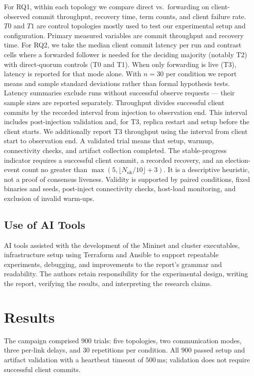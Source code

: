 \documentclass[11pt,a4paper]{article}
\begin{document}
For RQ1, within each topology we compare direct vs.\ forwarding on client-observed commit throughput, recovery time, term counts, and client failure rate.
$T0$ and $T1$ are control topologies mostly used to test our experimental setup and configuration.
Primary measured variables are commit throughput and recovery time.
For RQ2, we take the median client commit latency per run and contrast cells where a forwarded follower is needed for the deciding majority (notably T2) with direct-quorum controls (T0 and T1).
When only forwarding is live (T3), latency is reported for that mode alone.
With $n=30$ per condition we report means and sample standard deviations rather than formal hypothesis tests. Latency summaries exclude runs without successful observe requests --- their sample sizes are reported separately.
Throughput divides successful client commits by the recorded interval from injection to observation end. This interval includes post-injection validation and, for T3, replica restart and setup before the client starts. We additionally report T3 throughput using the interval from client start to observation end.
A validated trial means that setup, warmup, connectivity checks, and artifact collection completed. The stable-progress indicator requires a successful client commit, a recorded recovery, and an election-event count no greater than $\max(5,\lfloor N_{\mathrm{ok}}/10\rfloor+3)$. It is a descriptive heuristic, not a proof of consensus liveness.
Validity is supported by paired conditions, fixed binaries and seeds, post-inject connectivity checks, host-load monitoring, and exclusion of invalid warm-ups.

\subsection{Use of AI Tools}
AI tools assisted with the development of the Mininet and cluster executables, infrastructure setup using Terraform and Ansible to support repeatable experiments, debugging, and improvements to the report's grammar and readability. The authors retain responsibility for the experimental design, writing the report, verifying the results, and interpreting the research claims.

\section{Results}

The campaign comprised \(900\) trials: five topologies, two communication modes, three per-link delays, and \(30\) repetitions per condition.
All \(900\) passed setup and artifact validation with a heartbeat timeout of \(500\,\mathrm{ms}\); validation does not require successful client commits.
\end{document}
